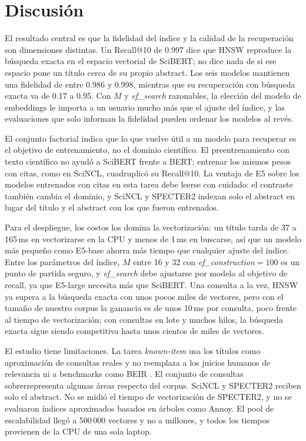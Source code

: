 \documentclass[runningheads]{llncs}
\newcommand{\efc}{\textit{ef\_construction}}
\newcommand{\efs}{\textit{ef\_search}}
\begin{document}
\section{Discusión}

El resultado central es que la fidelidad del índice y la calidad de la recuperación son
dimensiones distintas. Un Recall@10 de 0.997 dice que HNSW reproduce la búsqueda exacta en el
espacio vectorial de SciBERT; no dice nada de si ese espacio pone un título cerca de su propio
abstract. Los seis modelos mantienen una fidelidad de entre 0.986 y 0.998, mientras que su
recuperación con búsqueda exacta va de 0.17 a 0.95. Con $M$ y \efs{} razonables, la elección del modelo de
embeddings le importa a un usuario mucho más que el ajuste del índice, y las evaluaciones que
solo informan la fidelidad pueden ordenar los modelos al revés.

El conjunto factorial indica que lo que vuelve útil a un modelo para recuperar es el objetivo
de entrenamiento, no el dominio científico. El preentrenamiento con texto científico no ayudó a
SciBERT frente a BERT; entrenar los mismos pesos con citas, como en SciNCL, cuadruplicó su
Recall@10. La ventaja de E5 sobre los modelos entrenados con citas en esta tarea debe leerse con
cuidado: el contraste también cambia el dominio, y SciNCL y SPECTER2 indexan solo el abstract
en lugar del título y el abstract con los que fueron entrenados.

Para el despliegue, los costos los domina la vectorización: un título tarda de 37 a 165\,ms en
vectorizarse en la CPU y menos de 1\,ms en buscarse, así que un modelo más pequeño como
E5-base ahorra más tiempo que cualquier ajuste del índice. Entre los parámetros del índice, $M$
entre 16 y 32 con \efc{}$=100$ es un punto de partida seguro, y \efs{} debe ajustarse por modelo
al objetivo de recall, ya que E5-large necesita más que SciBERT. Una consulta a la vez, HNSW ya
supera a la búsqueda exacta con unos pocos miles de vectores, pero con el tamaño de nuestro
corpus la ganancia es de unos 10\,ms por consulta, poco frente al tiempo de vectorización; con
consultas en lote y muchos hilos, la búsqueda exacta sigue siendo competitiva hasta unos
cientos de miles de vectores.

El estudio tiene limitaciones. La tarea \textit{known-item} usa los títulos como aproximación
de consultas reales y no reemplaza a los juicios humanos de relevancia ni a benchmarks como
BEIR \cite{thakur2021}. El conjunto de consultas sobrerrepresenta algunas áreas respecto del
corpus. SciNCL y SPECTER2 reciben solo el abstract. No se midió el tiempo de vectorización de
SPECTER2, y no se evaluaron índices aproximados basados en árboles como Annoy. El pool de
escalabilidad llegó a 500\,000 vectores y no a millones, y todos los tiempos provienen de la
CPU de una sola laptop.
\end{document}

